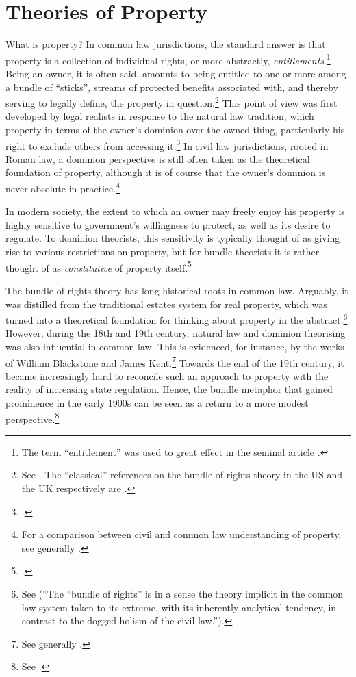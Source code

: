 \section{Theories of Property}\label{sec:top}

What is property? In common law jurisdictions, the standard answer is that property is a collection of individual rights, or more abstractly, {\it entitlements}.\footnote{The term ``entitlement'' was used to great effect in the seminal article \cite{calabresi72}.} Being an owner, it is often said, amounts to being entitled to one or more among a bundle of ``sticks'', streams of protected benefits associated with, and thereby serving to legally define, the property in question.\footnote{See \cite[357-358]{merrill01}. The ``classical'' references on the bundle of rights theory in the US and the UK respectively are \cite{hohfeld17,honore61}.} This point of view was first developed by legal realists in response to the natural law tradition, which  property in terms of the owner's dominion over the owned thing, particularly his right to exclude others from accessing it.\footcite[193-195]{klein11} In civil law jurisdictions, rooted in Roman law, a dominion perspective is still often taken as the theoretical foundation of property, although it is of course  that the owner's dominion is never absolute in practice.\footnote{For a comparison between civil and common law understanding of property, see generally \cite{chang12}.}

In modern society, the extent to which an owner may freely enjoy his property is highly sensitive to government's willingness to protect, as well as its desire to regulate. To dominion theorists, this sensitivity is typically thought of as giving rise to various restrictions on property, but for bundle theorists it is rather thought of as {\it constitutive} of property itself.\footcite[7]{chang12} 

The bundle of rights theory has long historical roots in common law. Arguably, it was distilled from the traditional estates system for real property, which was turned into a theoretical foundation for thinking about property in the abstract.\footnote{See \cite[7]{chang12}(``The ``bundle of rights'' is in a sense the theory implicit in the common law system taken to its extreme, with its inherently analytical tendency, in contrast to the dogged holism of the civil law.'').} However, during the 18th and 19th century, natural law and dominion theorising was also influential in common law. This is evidenced, for instance, by the works of William Blackstone and James Kent.\footnote{See generally \cite{blackstone79b,kent27}.} Towards the end of the 19th century, it became increasingly hard to reconcile such an approach to property with the reality of increasing state regulation. Hence, the bundle metaphor that gained prominence in the early 1900s can be seen as a return to a more modest perspective.\footnote{See \cite[195]{klein11}.}

